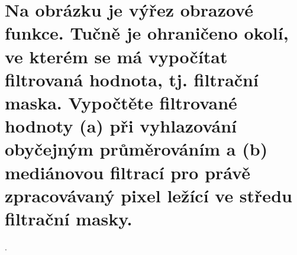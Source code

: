 \section{Na obrázku je výřez obrazové funkce. Tučně je ohraničeno okolí, ve kterém se má vypočítat filtrovaná hodnota, 
tj. filtrační maska. Vypočtěte filtrované hodnoty (a) při vyhlazování obyčejným průměrováním a (b) mediánovou filtrací 
pro právě zpracovávaný pixel ležící ve středu filtrační masky.}.